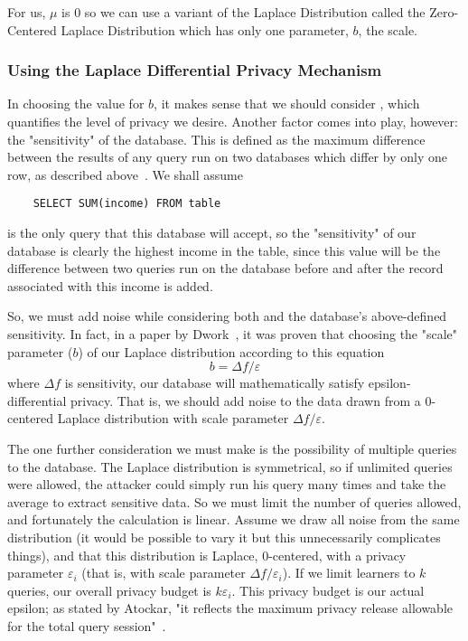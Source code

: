 \documentclass[conference,11pt]{IEEEtran}
\begin{document}
For us, $\mu$ is 0 so we can use a variant of the Laplace Distribution called
the Zero-Centered Laplace Distribution which has only one parameter, $b$, the
scale.

\subsubsection{Using the Laplace Differential Privacy Mechanism}\label{sec:using-laplace-dp}
In choosing the value for $b$, it makes sense that we should consider
\textepsilon, which quantifies the level of privacy we desire. Another factor
comes into play, however: the "sensitivity" of the database. This is defined as
the maximum difference between the results of any query run on two databases
which differ by only one row, as described above~\cite{Atockar:2014}. We shall
assume

\begin{verbatim}
    SELECT SUM(income) FROM table
\end{verbatim}
is the only query that this database will accept, so the "sensitivity" of our
database is clearly the highest income in the table, since this value will be
the difference between two queries run on the database before and after the
record associated with this income is added.

So, we must add noise while considering both {\textepsilon} and the database's
above-defined sensitivity. In fact, in a paper by
Dwork~\cite{Dwork:2011:private-data-analysis}, it was proven that choosing the
"scale" parameter ($b$) of our Laplace distribution according to this equation
\begin{equation}
    b = {\Delta}f/\varepsilon
\end{equation}
where ${\Delta}f$ is sensitivity, our database will mathematically satisfy
epsilon-differential privacy. That is, we should add noise to the data drawn
from a 0-centered Laplace distribution with scale parameter
${\Delta}f/\varepsilon$.

The one further consideration we must make is the possibility of multiple
queries to the database. The Laplace distribution is symmetrical, so if
unlimited queries were allowed, the attacker could simply run his query many
times and take the average to extract sensitive data. So we must limit the
number of queries allowed, and fortunately the calculation is linear. Assume we
draw all noise from the same distribution (it would be possible to vary it but
this unnecessarily complicates things), and that this distribution is Laplace,
0-centered, with a privacy parameter $\varepsilon_i$ (that is, with scale
parameter ${\Delta}f/\varepsilon_i$). If we limit learners to $k$ queries, our
overall privacy budget is $k\varepsilon_i$. This privacy budget is our
actual epsilon; as stated by Atockar, "it reflects the maximum privacy release
allowable for the total query session"~\cite{Atockar:2014}.
\end{document}
